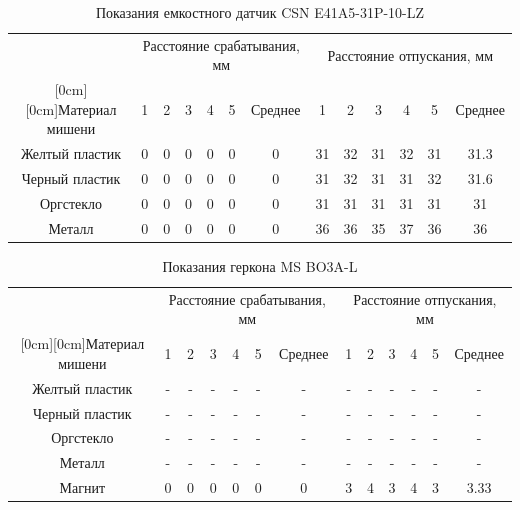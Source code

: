 \begin{table}[!h]
    \centering
    \caption{Показания емкостного датчик CSN E41A5-31P-10-LZ}
    \label{tab:3}
    \begin{tabular}{|c|c|c|c|c|c|c|c|c|c|c|c|c|}
        \hline
        & \multicolumn{6}{c|}{Расстояние срабатывания, мм} & \multicolumn{6}{c|}{Расстояние отпускания, мм}\\
        \cline{2-13}
        \raisebox{1.5ex}[0cm][0cm]{Материал мишени}
        & 1 & 2&3 &4 &5 & Среднее &1 &2 &3 &4 &5 &Среднее \\
        \hline
        Желтый пластик & 0& 0& 0& 0& 0& 0& 31& 32& 31& 32& 31& 31.3\\
        Черный пластик& 0& 0& 0& 0& 0& 0& 31& 32& 31& 31& 32& 31.6\\
        Оргстекло & 0& 0& 0& 0& 0& 0& 31& 31& 31& 31& 31& 31\\
        Металл & 0 & 0 & 0 & 0 & 0 & 0 & 36 & 36 & 35 & 37 &36 & 36\\
        \hline
    \end{tabular}
\end{table}

\begin{table}[!h]
    \centering
    \caption{Показания геркона MS BO3A-L}
    \label{tab:4}
    \begin{tabular}{|c|c|c|c|c|c|c|c|c|c|c|c|c|}
        \hline
        & \multicolumn{6}{c|}{Расстояние срабатывания, мм} & \multicolumn{6}{c|}{Расстояние отпускания, мм}\\
        \cline{2-13}
        \raisebox{1.5ex}[0cm][0cm]{Материал мишени}
        & 1 & 2&3 &4 &5 & Среднее &1 &2 &3 &4 &5 &Среднее \\
        \hline
        Желтый пластик & -& -& -& -& -& -& -& -& -& -& -& -\\
        Черный пластик& -& -& -& -& -& -& -& -& -& -& -& -\\
        Оргстекло & -& -& -& -& -& -& -& -& -& -& -& -\\
        Металл & -& -& -& -& -& -& -& -& -& -& -& -\\
        Магнит & 0 & 0 & 0 & 0 & 0 & 0 & 3 & 4 & 3 & 4 &3 & 3.33\\
        \hline
    \end{tabular}
\end{table}

